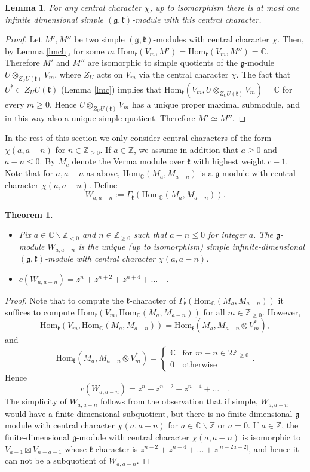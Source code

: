 \documentclass[12pt]{amsart}
\theoremstyle{plain} %
\newtheorem{theorem}[definition]{Theorem}
\newtheorem{lemma}[definition]{Lemma}
\renewcommand{\hom}{\mathrm{Hom}}
\newcommand {\ZZ} {\mathbb {Z}}
\newcommand {\CC} {\mathbb {C}}
\newcommand{\kk}{\mathfrak{k}}
\renewcommand{\gg}{\mathfrak{g}}
\newcommand{\refle}[1]{Lemma \ref{#1}}
\begin{document}
\begin{lemma}\label{le00}
For any central character $\chi$, up to isomorphism there is at most one infinite
dimensional simple $(\gg,\kk)$-module with this central character.
\end{lemma}
\begin{proof}
Let $M',M''$ be two simple $(\gg,\kk)$-modules with central character
$\chi$. Then, by \refle{lmch}, for some $m$
$\hom_\kk(V_m,M')=\hom_\kk(V_m,M'')=\CC$. Therefore $M'$ and $M''$ are
isomorphic to simple quotients of the $\gg$-module $U\otimes_{Z_U
  U(\kk)}V_m$, where $Z_U$ acts on $V_m$ via the central character
$\chi$. The fact that $U^\kk\subset Z_U U(\kk)$ (\refle{lmc}) implies
that $\hom_\kk(V_m, U\otimes_{Z_U U(\kk)}V_m)=\CC$ for every $m\geq
0$. Hence $U\otimes_{Z_U U(\kk)}V_m$ has a unique proper maximal
submodule, and in this way also a unique simple quotient. Therefore $M'\simeq M''$.
\end{proof}

In the rest of this section  we only consider central characters of
the form $\chi(a,a-n)$ for $n\in\mathbb Z_{\geq 0}$. If $a\in \ZZ$, we assume in addition that $a\geq 0$ and $a-n \leq 0$. By $M_c$ denote the Verma module over $\kk$ with highest weight $c-1$. Note that
for $a,a-n$ as above, $\hom_{\CC}(M_{a},M_{a-n})$ is a $\gg$-module with central character $\chi(a,a-n)$. Define
\[
W_{a,a-n}:=\Gamma_{\kk}(\hom_{\CC} (M_{a},M_{a-n})).
\]
\begin{theorem}\label{thMainSCT}~
\begin{itemize}
\item[(a)] Fix $a\in\CC\backslash \ZZ_{< 0}$ and $n\in \ZZ_{\geq 0}$ such that $a-n\leq 0$ for integer $a$. The $\gg$-module $W_{a,a-n}$ is the unique (up to isomorphism) simple infinite-dimensional $(\gg,\kk)$-module with central character $\chi(a,a-n)$.
\item[(b)] $c(W_{a,a-n})=z^n+z^{n+2}+z^{n+4}+\dots\quad .$
\end{itemize}
\end{theorem}
\begin{proof} Note that to compute the
$\kk$-character of
$\Gamma_{\kk}(\hom_{\CC}(M_a,M_{a-n}))$ it suffices to compute
  $\hom_\kk(V_m,\hom_{\CC}(M_a,M_{a-n}))$ for all $m\in \ZZ_{\geq 0}$. However,
\[
\hom_\kk(V_m,\hom_{\CC}(M_a,M_{a-n}))=\hom_\kk(M_a,M_{a-n}\otimes V_m^*),
\]
and
\[
\hom_\kk(M_a, M_{a-n}\otimes V_m^*)=\left\{\begin{array}{cc}\CC&\text{for~}m-n\in2\ZZ_{\geq 0}\\0&\text{otherwise}\end{array}\right. .
\]
Hence
\[
c(W_{a,a-n})=z^n+z^{n+2}+z^{n+4}+\dots\quad .
\]
The simplicity of $W_{a,a-n}$ follows from the observation that if simple, $W_{a,a-n}$ would have a finite-dimensional subquotient, but
there is no finite-dimensional $\gg$-module with central character
$\chi(a,a-n)$ for $a\in \CC\backslash \ZZ$ or $a=0$.  If $a\in
\ZZ $, the finite-dimensional $\gg$-module with central
character $\chi(a,a-n)$ is isomorphic to $V_{a-1}\boxtimes V_{n-a-1}$
whose $\kk$-character is $z^{n-2}+z^{n-4}+...+z^{|n-2a-2|}$, and
hence it can not be a subquotient of $W_{a,a-n}$.
\end{proof}
\end{document}
